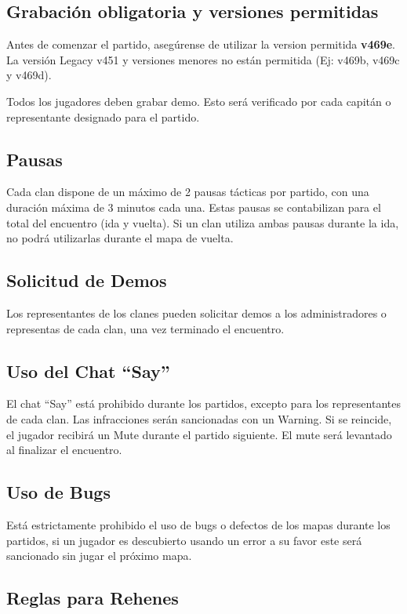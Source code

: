 \documentclass[a4paper, 11pt]{article}
\begin{document}
    \subsection{Grabación obligatoria y versiones permitidas}
    Antes de comenzar el partido, asegúrense de utilizar la version permitida \textbf{v469e}. La versión Legacy v451 y versiones menores no están permitida (Ej: v469b, v469c y v469d).

    Todos los jugadores deben grabar demo. Esto será verificado por cada capitán o representante designado para el partido. 

    \subsection{Pausas}

    Cada clan dispone de un máximo de 2 pausas tácticas por partido, con una duración máxima de 3 minutos cada una. 
    Estas pausas se contabilizan para el total del encuentro (ida y vuelta). Si un clan utiliza ambas pausas durante la ida, no podrá utilizarlas durante el mapa de vuelta.

    \subsection{Solicitud de Demos}
    Los representantes de los clanes pueden solicitar demos a los administradores o representas de cada clan, una vez terminado el encuentro.

    \subsection{Uso del Chat “Say”}
    El chat “Say” está prohibido durante los partidos, excepto para los representantes de cada clan. Las infracciones serán sancionadas con un Warning. Si se reincide, el jugador recibirá un Mute durante el partido siguiente. El mute será levantado al finalizar el encuentro.

    \subsection{Uso de Bugs}
    Está estrictamente prohibido el uso de bugs o defectos de los mapas durante los partidos, si un jugador es descubierto usando un error a su favor este será sancionado sin jugar el próximo mapa.

    \subsection{Reglas para Rehenes}
\end{document}
